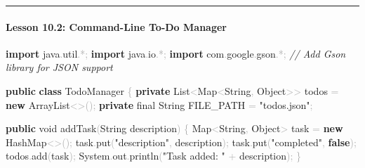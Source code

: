 \documentclass[
  justified,
  openright,
]{tufte-book}
\let\subsection\paragraph
\let\paragraph\paragraph
\newcommand{\KeywordTok}[1]{\textcolor{CodeKeyword}{\textbf{#1}}}  %
\newcommand{\StringTok}[1]{\textcolor{CodeString}{#1}}              %
\newcommand{\CommentTok}[1]{\textcolor{CodeComment}{\textit{#1}}}  %
\newcommand{\CodeFuncTok}[1]{\textcolor{CodeKeyword}{#1}}           %
\newcommand{\CodeTypeTok}[1]{\textcolor{CodeType}{#1}}              %
\newcommand{\CodeAccentTok}[1]{\textcolor{CodeAccent}{#1}}          %
\newcommand{\OperatorTok}[1]{\textcolor{DarkGray}{#1}}              %
\newenvironment{Shaded}{%
  \begin{mdframed}[style=TufteCode]%
}{%
  \end{mdframed}%
}
\let\subsection\paragraph
\let\paragraph\paragraph
\begin{document}
\begin{center}\rule{0.5\linewidth}{0.5pt}\end{center}

\subsection{Lesson 10.2: Command-Line To-Do
Manager}\label{lesson-10.2-command-line-to-do-manager-1}

\begin{Shaded}
\begin{Highlighting}[]
\KeywordTok{import} \CodeAccentTok{java}\OperatorTok{.}\CodeAccentTok{util}\OperatorTok{.*;}
\KeywordTok{import} \CodeAccentTok{java}\OperatorTok{.}\CodeAccentTok{io}\OperatorTok{.*;}
\KeywordTok{import} \CodeAccentTok{com}\OperatorTok{.}\CodeAccentTok{google}\OperatorTok{.}\CodeAccentTok{gson}\OperatorTok{.*;}   \CommentTok{// Add Gson library for JSON support}
 
\KeywordTok{public} \KeywordTok{class} TodoManager \OperatorTok{\{}
    \KeywordTok{private} List\OperatorTok{\textless{}}Map\OperatorTok{\textless{}}String\OperatorTok{,} Object\OperatorTok{\textgreater{}\textgreater{}} todos \OperatorTok{=} \KeywordTok{new} ArrayList\OperatorTok{\textless{}\textgreater{}();}
    \KeywordTok{private} \CodeTypeTok{final} String FILE\_PATH \OperatorTok{=} \StringTok{"todos.json"}\OperatorTok{;}
 
    \KeywordTok{public} \CodeTypeTok{void} \CodeFuncTok{addTask}\OperatorTok{(}String description\OperatorTok{)} \OperatorTok{\{}
        Map\OperatorTok{\textless{}}String\OperatorTok{,} Object\OperatorTok{\textgreater{}} task \OperatorTok{=} \KeywordTok{new} HashMap\OperatorTok{\textless{}\textgreater{}();}
        task\OperatorTok{.}\CodeFuncTok{put}\OperatorTok{(}\StringTok{"description"}\OperatorTok{,} description\OperatorTok{);}
        task\OperatorTok{.}\CodeFuncTok{put}\OperatorTok{(}\StringTok{"completed"}\OperatorTok{,} \KeywordTok{false}\OperatorTok{);}
        todos\OperatorTok{.}\CodeFuncTok{add}\OperatorTok{(}task\OperatorTok{);}
        System\OperatorTok{.}\CodeFuncTok{out}\OperatorTok{.}\CodeFuncTok{println}\OperatorTok{(}\StringTok{"Task added: "} \OperatorTok{+} description\OperatorTok{);}
    \OperatorTok{\}}
 

\end{Highlighting}
\end{Shaded}
\end{document}
